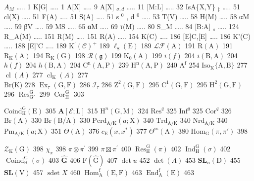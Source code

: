 
\(A_{M}\) \ldots.. 1 K{[}G{]} \ldots.. 1 A{[}X{]} \ldots.. 9 A{[}X{]} \(_{\sigma,d}\) \ldots.. 11 {[}M:L{]} \ldots.. 32 IsA\{X,Y\} \(_{\ddagger}\) \ldots.. 51 cl(X) \ldots.. 51 F(A) \ldots.. 51 S(A) \ldots.. 51 s \(^{0}\) , d \(^{0}\) \ldots.. 53 T(V) \ldots.. 58 H(M) \ldots.. 58 αM \ldots.. 59 βV \ldots.. 59 MS \ldots.. 65 αM \ldots.. 69 τ(M) \ldots.. 80 S\_M \ldots.. 84 {[}B:A{]} \(_{s}\) \ldots.. 124 R\_A(M) \ldots.. 151 R(M) \ldots.. 151 R(A) \ldots.. 154 K(C) \ldots.. 186 {[}E{]}C,{[}E{]} \ldots.. 186 K'(C) \ldots.. 188 {[}E{]}'C \ldots.. 189 \(\mathrm{K}^{\prime}(\mathcal{C})^{+}\) 189 \(\ell_{\mathrm{S}}(\mathrm{E})\) 189 \(\mathcal{L}\mathcal{F}(\mathrm{A})\) 191 \(\mathrm{R(A)}\) 191 \(\mathrm{R_K(A)}\) 194 \(\mathrm{R_K(G)}\) 198 \(\mathcal{R}(\mathfrak{g})\) 199 \(\mathrm{K_0(A)}\) 199 \(i(f)\) 204 \(i(\mathrm{B,A})\) 204 \(h(f)\) 204 \(h(\mathrm{B,A})\) 204 \(\mathrm{C^n(A,P)}\) 239 \(\mathrm{H^n(A,P)}\) 240 \(\mathrm{A^f}\) 254 \(\mathrm{Iso}_{\mathrm{K}}\{\mathrm{A},\mathrm{B}\}\) 277 \(\operatorname {cl}(A)\) 277 \(\operatorname {cl}_{\mathrm{K}}(A)\) 277\\
Br(K) 278 \(\operatorname {Ex}_{\tau}(\mathrm{G},\mathrm{F})\) 286 \(\mathcal{I}_{\tau}\) 286 \(\mathrm{Z}^2 (\mathrm{G},\mathrm{F})\) 295 \(\mathrm{C}^1 (\mathrm{G},\mathrm{F})\) 295 \(\mathrm{H}^2 (\mathrm{G},\mathrm{F})\) 296 \(\operatorname {Res}_{\mathrm{G}'}^{\mathrm{G}}\) 299 \(\operatorname {Cor}_{\mathrm{H}}^{\mathrm{G}}\) 303

\(\mathrm{Coind}_{\mathrm{H}}^{\mathrm{G}}(\mathrm{E})\) 305 \(\mathbf{A}[\mathcal{E};\mathrm{L}]\) 315 \(\mathrm{H}^n (\mathrm{G},\mathrm{M})\) 324 \(\mathrm{Res}^q\) 325 \(\mathrm{Inf}^q\) 325 \(\mathrm{Cor}^q\) 326 \(\mathrm{Br(A)}\) 330 \(\mathrm{Br(B / A)}\) 330 \(\mathrm{Pcrd}_{\mathrm{A / K}}(a;\mathrm{X})\) 340 \(\mathrm{Trd}_{\mathrm{A / K}}\) 340 \(\mathrm{Nrd}_{\mathrm{A / K}}\) 340 \(\mathrm{Pm}_{\mathrm{A / K}}(a;\mathrm{X})\) 351 \(\Theta (\mathrm{A})\) 376 \(c_{\mathrm{E}}(x,x^{*})\) 377 \(\Theta^{\mathrm{ss}}(\mathrm{A})\) 380 \(\mathrm{Hom}_{\mathrm{G}}(\pi ,\pi ')\) 398

\(\mathcal{Z}_{\mathrm{K}}(\mathrm{G})\) 398 \(\chi_{\pi}\) 398 \(\pi \otimes \pi^{\prime}\) 399 \(\pi \boxtimes \pi^{\prime}\) 400 \(\operatorname{Res}_{\mathrm{H}}^{\mathrm{G}}(\pi)\) 402 \(\operatorname{Ind}_{\mathrm{H}}^{\mathrm{G}}(\sigma)\) 402 \(\operatorname{Coind}_{\mathrm{H}}^{\mathrm{G}}(\sigma)\) 403 \(\widehat{\mathbf{G}}\) 406 \(\mathrm{F}(\widehat{\mathrm{G}})\) 407 \(\det u\) 452 \(\det(A)\) 453 \(\mathbf{SL}_n(\mathrm{D})\) 455 \(\mathbf{SL}(\mathrm{V})\) 457 \(\operatorname{sdet} X\) 460 \(\operatorname{Hom}_{\mathrm{A}}^{\mathrm{f}}(\mathrm{E},\mathrm{F})\) 463 \(\operatorname{End}_{\mathrm{A}}^{\mathrm{f}}(\mathrm{E})\) 463

